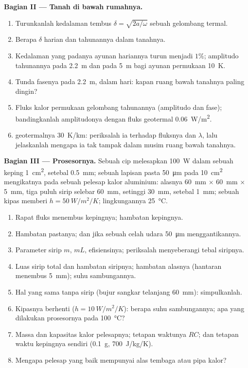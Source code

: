 \begin{problem}
\textbf{Bagian II --- Tanah di bawah rumahnya.}
\begin{enumerate}[resume]
  \item Turunkanlah kedalaman tembus $\delta = \sqrt{2a/\omega}$ sebuah
        gelombang termal.
  \item Berapa $\delta$ harian dan tahunannya dalam tanahnya.
  \item Kedalaman yang padanya ayunan hariannya turun menjadi $1\%$; amplitudo
        tahunannya pada \qty{2.2}{m} dan pada \qty{5}{m} bagi ayunan permukaan
        \qty{10}{K}.
  \item Tunda fasenya pada \qty{2.2}{m}, dalam hari: kapan ruang bawah tanahnya paling dingin?
  \item Fluks kalor permukaan gelombang tahunannya (amplitudo dan fase);
        bandingkanlah amplitudonya dengan fluks geotermal \qty{0.06}{W/m^2}.
  \item {} geotermalnya \qty{30}{K/km}: periksalah ia terhadap
        fluksnya dan $\lambda$, lalu jelaskanlah mengapa ia tak tampak dalam
        musim ruang bawah tanahnya.
\end{enumerate}

\textbf{Bagian III --- Prosesornya.}
Sebuah cip melesapkan \qty{100}{W} dalam sebuah keping \qty{1}{cm^2}, setebal \qty{0.5}{mm};
sebuah lapisan pasta \qty{50}{\micro m} pada \qty{10}{cm^2} mengikatnya
pada sebuah pelesap kalor aluminium: alasnya \qty{60}{mm} $\times$ \qty{60}{mm} $\times$
\qty{5}{mm}, tiga puluh sirip selebar \qty{60}{mm}, setinggi \qty{30}{mm}, setebal \qty{1}{mm};
sebuah kipas memberi $h = \qty{50}{W/m^2/K}$; lingkungannya \qty{25}{\celsius}.
\begin{enumerate}[resume]
  \item Rapat fluks menembus kepingnya; hambatan kepingnya.
  \item Hambatan pastanya; dan jika sebuah celah udara \qty{50}{\micro m}
        menggantikannya.
  \item Parameter sirip $m$, $mL$, efisiensinya; periksalah 
        menyeberangi tebal siripnya.
  \item Luas sirip total dan hambatan siripnya; hambatan
        alasnya (hantaran menembus \qty{5}{mm}); suhu sambungannya.
  \item Hal yang sama tanpa sirip (bujur sangkar telanjang \qty{60}{mm}): simpulkanlah.
  \item Kipasnya berhenti ($h = \qty{10}{W/m^2/K}$): berapa suhu sambungannya;
        apa yang dilakukan prosesornya pada \qty{100}{\celsius}?
  \item Massa dan kapasitas kalor pelesapnya; tetapan waktunya $RC$;
        dan tetapan waktu kepingnya sendiri (\qty{0.1}{g}, \qty{700}{J/kg/K}).
  \item Mengapa pelesap yang baik mempunyai alas tembaga atau pipa kalor?
\end{enumerate}


\end{problem}

